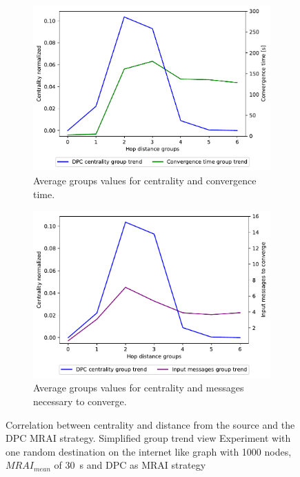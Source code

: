 \documentclass[10pt,conference,letterpaper]{IEEEtran}
\newcommand{\figwidth}{0.78}
\newcommand{\figvspace}{-1.5em}
\begin{document}
\begin{figure}[tb]
	\centering

	\begin{subfigure}{\columnwidth}
		\centering
		\includegraphics[width=\figwidth\columnwidth]{images/different_destinations/1000-dpc-d0_node-conv_MRAI30_centVStime_trend.pdf}
		\caption{Average groups values for centrality and convergence time.}
		\label{fig:1000-dpc_node_conv_centVStime_trend}
		\qquad
	\end{subfigure}

	\begin{subfigure}{\columnwidth}
		\centering
		\includegraphics[width=\figwidth\columnwidth]{images/different_destinations/1000-dpc-d0_node-conv_MRAI30_centVSmsg_trend.pdf}
		\caption{Average groups values for centrality and messages necessary to converge.}
		\label{fig:1000-dpc_node_conv_centVSmsg_trend}
		\qquad
	\end{subfigure}

	\caption{Correlation between centrality and distance from the source and the \ac{DPC} \ac{MRAI} strategy.
			 Simplified group trend view
			 Experiment with one random destination on the internet like graph with
			 \num{1000} nodes, $MRAI_{mean}$ of \SI{30}{\second} and \ac{DPC} as
			 \ac{MRAI} strategy}
	\label{fig:1000-dpc_node_conv_trend}
	\vspace{\figvspace}
\end{figure}
\end{document}
